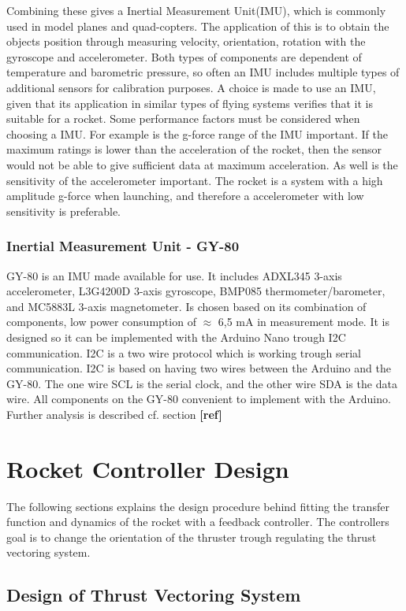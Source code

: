 Combining these gives a Inertial Measurement Unit(IMU), which is commonly used in model planes and quad-copters. The application of this is to obtain the objects position through measuring velocity, orientation, rotation with the gyroscope and accelerometer. Both types of components are dependent of temperature and barometric pressure, so often an IMU includes multiple types of additional sensors for calibration purposes. A choice is made to use an IMU, given that its application in similar types of flying systems verifies that it is suitable for a rocket.    	  
Some performance factors must be considered when choosing a IMU. For example is the g-force range of the IMU important. If the maximum ratings is lower than the acceleration of the rocket, then the sensor would not be able to give sufficient data at maximum acceleration. As well is the sensitivity of the accelerometer important. The rocket is a system with a high amplitude g-force when launching, and therefore a accelerometer with low sensitivity is preferable.

\subsubsection{Inertial Measurement Unit - GY-80}
GY-80\cite{web:GY80} is an IMU made available for use. It includes ADXL345 3-axis accelerometer, L3G4200D 3-axis gyroscope, BMP085 thermometer/barometer, and MC5883L 3-axis magnetometer. Is chosen based on its combination of components, low power consumption of $\approx$ 6,5 mA in measurement mode. It is designed so it can be implemented with the Arduino Nano trough I2C communication. 
I2C is a two wire protocol which is working trough serial communication. I2C is based on having two wires between the Arduino and the GY-80. The one wire SCL is the serial clock, and the other wire SDA is the data wire. All components on the GY-80 convenient to implement with the Arduino. Further analysis is described cf. section \textbf{[ref]} 



\section{Rocket Controller Design}\label{sec:RocketControllerDesign}
The following sections explains the design procedure behind fitting the transfer function and dynamics of the rocket with a feedback controller. The controllers goal is to change the orientation of the thruster trough regulating the thrust vectoring system.    


\subsection{Design of Thrust Vectoring System}

  
